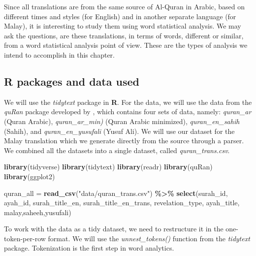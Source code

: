 \documentclass[
]{article}
\newenvironment{Shaded}{\begin{snugshade}}{\end{snugshade}}
\newcommand{\FunctionTok}[1]{\textcolor[rgb]{0.13,0.29,0.53}{\textbf{#1}}}
\newcommand{\NormalTok}[1]{#1}
\newcommand{\OtherTok}[1]{\textcolor[rgb]{0.56,0.35,0.01}{#1}}
\newcommand{\SpecialCharTok}[1]{\textcolor[rgb]{0.81,0.36,0.00}{\textbf{#1}}}
\newcommand{\StringTok}[1]{\textcolor[rgb]{0.31,0.60,0.02}{#1}}
\begin{document}
Since all translations are from the same source of Al-Quran in Arabic, based on different times and styles (for English) and in another separate language (for Malay), it is interesting to study them using word statistical analysis. We may ask the questions, are these translations, in terms of words, different or similar, from a word statistical analysis point of view. These are the types of analysis we intend to accomplish in this chapter.

\hypertarget{R-packages-and-data-used}{%
\subsection{R packages and data used}\label{R-packages-and-data-used}}

We will use the \emph{tidytext} package in \textbf{R}. For the data, we will use the data from the \emph{quRan} package developed by \citep{quRan}, which contains four sets of data, namely: \emph{quran\_ar} (Quran Arabic), \emph{quran\_ar\_min)} (Quran Arabic minimized), \emph{quran\_en\_sahih} (Sahih), and \emph{quran\_en\_yusufali} (Yusuf Ali). We will use our dataset for the Malay translation which we generate directly from the source through a parser. We combined all the datasets into a single dataset, called \emph{quran\_trans.csv}.

\footnotesize

\begin{Shaded}
\begin{Highlighting}[]
\FunctionTok{library}\NormalTok{(tidyverse)}
\FunctionTok{library}\NormalTok{(tidytext)}
\FunctionTok{library}\NormalTok{(readr)}
\FunctionTok{library}\NormalTok{(quRan)}
\FunctionTok{library}\NormalTok{(ggplot2)}

\NormalTok{quran\_all }\OtherTok{=} \FunctionTok{read\_csv}\NormalTok{(}\StringTok{"data/quran\_trans.csv"}\NormalTok{) }\SpecialCharTok{\%\textgreater{}\%} 
              \FunctionTok{select}\NormalTok{(surah\_id, ayah\_id, surah\_title\_en, }
\NormalTok{                     surah\_title\_en\_trans, revelation\_type,}
\NormalTok{                     ayah\_title,}
\NormalTok{                     malay,saheeh,yusufali)}
\end{Highlighting}
\end{Shaded}

\normalsize

To work with the data as a tidy dataset, we need to restructure it in the one-token-per-row format. We will use the \emph{unnest\_tokens()} function from the \emph{tidytext} package. Tokenization is the first step in word analytics.
\end{document}
